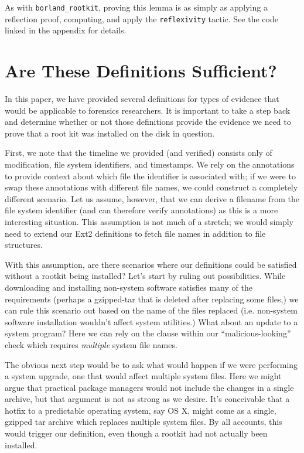 \documentclass[nocopyrightspace]{sigplanconf}
\begin{document}
As with {\tt borland\_rootkit}, proving this lemma is as simply as applying a
reflection proof, computing, and apply the {\tt reflexivity} tactic. See the
code linked in the appendix for details.


\section{Are These Definitions Sufficient?}
\label{sec:sufficient}

In this paper, we have provided several definitions for types of evidence that
would be applicable to forensics researchers. It is important to take a step
back and determine whether or not those definitions provide the evidence we
need to prove that a root kit was installed on the disk in question. 

First, we note that the timeline we provided (and verified) consists only of
modification, file system identifiers, and timestamps. We rely on the
annotations to provide context about which file the identifier is associated
with; if we were to swap these annotations with different file names, we could
construct a completely different scenario. Let us assume, however, that we can
derive a filename from the file system identifier (and can therefore verify
annotations) as this is a more interesting situation. This assumption is not
much of a stretch; we would simply need to extend our Ext2 definitions to
fetch file names in addition to file structures.

With this assumption, are there scenarios where our definitions could be
satisfied without a rootkit being installed? Let's start by ruling out
possibilities. While downloading and installing non-system software satisfies
many of the requirements (perhaps a gzipped-tar that is deleted after
replacing some files,) we can rule this scenario out based on the name of the
files replaced (i.e. non-system software installation wouldn't affect system
utilities.) What about an update to a system program? Here we can rely on the
clause within our ``malicious-looking'' check which requires {\em multiple}
system file names.

The obvious next step would be to ask what would happen if we were performing
a system upgrade, one that would affect multiple system files. Here we might
argue that practical package managers would not include the changes in a
single archive, but that argument is not as strong as we desire. It's
conceivable that a hotfix to a predictable operating system, say OS X, might
come as a single, gzipped tar archive which replaces multiple system files. By
all accounts, this would trigger our definition, even though a rootkit had
not actually been installed.
\end{document}

